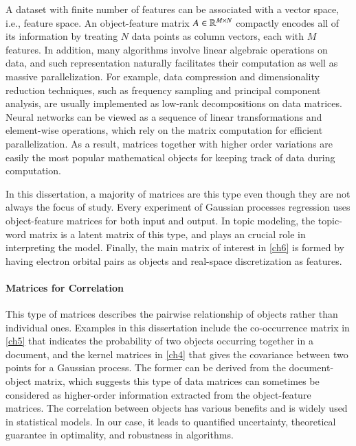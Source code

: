 A dataset with finite number of features can be associated with a
vector space, i.e., feature space. An object\hyp{}feature matrix $A\in\mathbb{R}^
{M\mathbin{\times} N}$ compactly encodes all of its information by treating $N$
data points as column vectors, each with $M$ features. In addition, many
algorithms involve linear algebraic operations on data, and such representation
naturally facilitates their computation as well as massive parallelization. For
example, data compression and dimensionality reduction techniques, such as
frequency sampling and principal component analysis, are usually implemented as
low\hyp{}rank decompositions on data matrices. Neural networks can be viewed as
a sequence of linear transformations and element\hyp{}wise operations, which
rely on the matrix computation for efficient parallelization. As a result,
matrices together with higher order variations are easily the most popular
mathematical objects for keeping track of data during computation.

In this dissertation, a majority of matrices are this type even though they are
not always the focus of study. Every experiment of Gaussian processes regression
uses object\hyp{}feature matrices for both input and output. In topic modeling,
the topic\hyp{}word matrix is a latent matrix of this type, and plays an
crucial role in interpreting the model. Finally, the main matrix of interest
in \cref{ch6} is formed by having electron orbital pairs as objects and 
real\hyp{}space discretization as features.

\paragraph{Matrices for Correlation}

This type of matrices describes the pairwise relationship of objects rather
than individual ones. Examples in this dissertation include the 
co\hyp{}occurrence matrix in \cref{ch5} that indicates the probability of two
objects occurring together in a document, and the kernel matrices in \cref{ch4} 
that gives the covariance between two points for a Gaussian process. The former
can be derived from the document\hyp{}object matrix, which suggests this type of
data matrices can sometimes be considered as higher\hyp{}order information
extracted from the object\hyp{}feature matrices. The correlation
between objects has various benefits and is widely used in statistical models.
In our case, it leads to quantified uncertainty, theoretical guarantee in
optimality, and robustness in algorithms.

